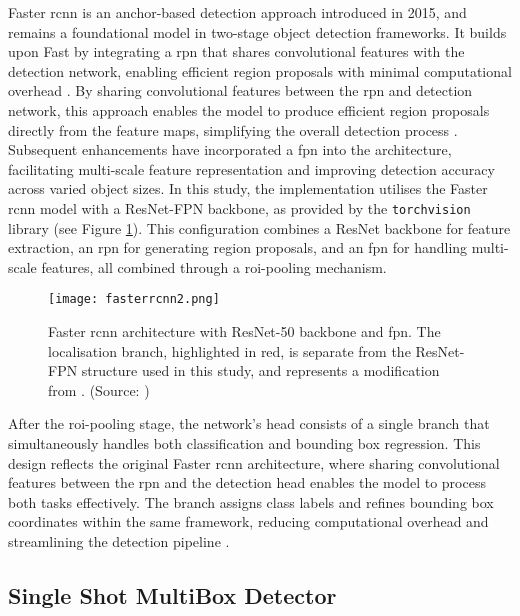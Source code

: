 Faster \gls{rcnn} \cite{fasterrcnn} is an anchor-based detection approach introduced in 2015, and remains a foundational model in two-stage object detection frameworks. It builds upon Fast \cite{fastrcnn} by integrating a \gls{rpn} that shares convolutional features with the detection network, enabling efficient region proposals with minimal computational overhead \cite{fasterrcnn}. By sharing convolutional features between the \gls{rpn} and detection network, this approach enables the model to produce efficient region proposals directly from the feature maps, simplifying the overall detection process \cite{fasterrcnn}.
Subsequent enhancements have incorporated a \gls{fpn} into the architecture, facilitating multi-scale feature representation and improving detection accuracy across varied object sizes. In this study, the implementation utilises the Faster \gls{rcnn} model with a ResNet-FPN backbone, as provided by the \verb|torchvision| library (see Figure \ref{fig:fasterrcnn2}). This configuration combines a ResNet backbone for feature extraction, an \gls{rpn} for generating region proposals, and an \gls{fpn} for handling multi-scale features, all combined through a \gls{roi}-pooling mechanism.

\begin{figure}[!htbp]
    \centering
    \texttt{[image: fasterrcnn2.png]}
    \caption{Faster \gls{rcnn} architecture with ResNet-50 backbone and \gls{fpn}. The localisation branch, highlighted in red, is separate from the ResNet-FPN structure used in this study, and represents a modification from \cite{fasterrcnn_diagram}. (Source: \cite{fasterrcnn_diagram})}
    \label{fig:fasterrcnn2}
\end{figure}

After the \gls{roi}-pooling stage, the network’s head consists of a single branch that simultaneously handles both classification and bounding box regression. This design reflects the original Faster \gls{rcnn} architecture, where sharing convolutional features between the \gls{rpn} and the detection head enables the model to process both tasks effectively. The branch assigns class labels and refines bounding box coordinates within the same framework, reducing computational overhead and streamlining the detection pipeline \cite{fasterrcnn}.

\subsection{Single Shot MultiBox Detector}
\label{subsec:4_ssd}

